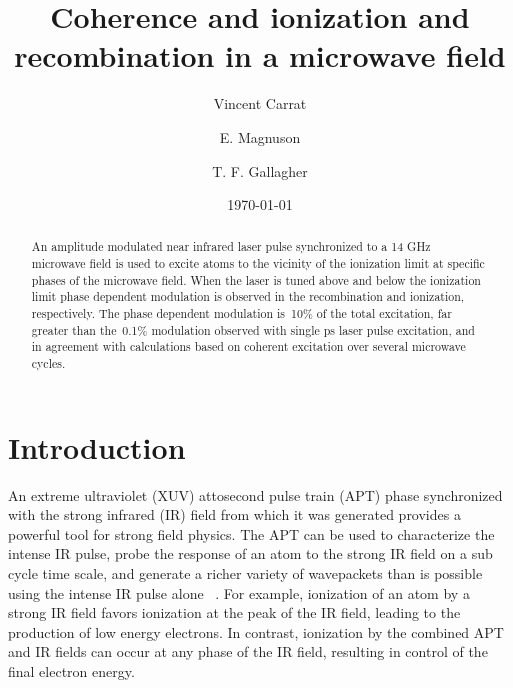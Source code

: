 \documentclass[pra, reprint]{revtex4-1}
\begin{document}
\title{Coherence and ionization and recombination in a microwave field}
\date{\today}
\author{Vincent Carrat}
\author{E. Magnuson}
\author{T. F. Gallagher}

\begin{abstract}
An amplitude modulated near infrared laser pulse synchronized to a 14 GHz microwave field is used to excite atoms to the vicinity of the ionization limit at specific phases of the microwave field. When the laser is tuned above and below the ionization limit phase dependent modulation is observed in the recombination and ionization, respectively. The phase dependent modulation is~10\% of the total excitation, far greater than the~0.1\% modulation observed with single ps laser pulse excitation, and in agreement with calculations based on coherent excitation over several microwave cycles. 
\end{abstract}

\maketitle

\section{Introduction}

An extreme ultraviolet (XUV) attosecond pulse train (APT) phase synchronized with the strong infrared (IR) field from which it was generated provides a powerful tool for strong field physics. The APT can be used to characterize the intense IR pulse, probe the response of an atom to the strong IR field on a sub cycle time scale, and generate a richer variety of wavepackets than is possible using the intense IR pulse alone ~\cite{Goulielmakis_2004,Shivaram_2012,Johnsson_2005,Chini_2012,Ranitovich_2010}. For example, ionization of an atom by a strong IR field favors ionization at the peak of the IR field, leading to the production of low energy electrons. In contrast, ionization by the combined APT and IR fields can occur at any phase of the IR field, resulting in control of the final electron energy\cite{Ranitovich_2010,Johnsson_2005}.
\end{document}
